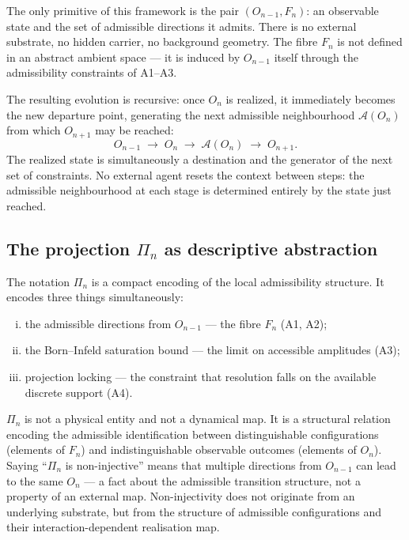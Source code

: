 \documentclass[11pt,a4paper]{article}
\begin{document}
    The only primitive of this framework is the pair $(O_{n-1}, F_n)$: an observable
    state and the set of admissible directions it admits.
    There is no external substrate, no hidden carrier, no background geometry.
    The fibre $F_n$ is not defined in an abstract ambient space — it is induced by
    $O_{n-1}$ itself through the admissibility constraints of A1--A3.

    The resulting evolution is recursive: once $O_n$ is realized, it immediately becomes
    the new departure point, generating the next admissible neighbourhood $\mathcal{A}(O_n)$
    from which $O_{n+1}$ may be reached:
    \begin{equation}
      \label{eq:recursive-chain}
      O_{n-1}
      \;\longrightarrow\; O_n
      \;\longrightarrow\; \mathcal{A}(O_n)
      \;\longrightarrow\; O_{n+1}.
    \end{equation}
    The realized state is simultaneously a destination and the generator of the next set of
    constraints.
    No external agent resets the context between steps: the admissible neighbourhood at
    each stage is determined entirely by the state just reached.

  \subsection{The projection $\Pi_n$ as descriptive abstraction}

    The notation $\Pi_n$ is a compact encoding of the local admissibility structure.
    It encodes three things simultaneously:
    \begin{enumerate}[(i)]
\item the admissible directions from $O_{n-1}$ — the fibre $F_n$ (A1, A2);
\item the Born--Infeld saturation bound — the limit on accessible amplitudes (A3);
\item projection locking — the constraint that resolution falls on the available
discrete support (A4).
    \end{enumerate}

    $\Pi_n$ is not a physical entity and not a dynamical map.
    It is a structural relation encoding the admissible identification between
    distinguishable configurations (elements of $F_n$) and indistinguishable
    observable outcomes (elements of $O_n$).
    Saying ``$\Pi_n$ is non-injective'' means that multiple directions from
    $O_{n-1}$ can lead to the same $O_n$ — a fact about the admissible transition
    structure, not a property of an external map.
    Non-injectivity does not originate from an underlying substrate, but from
    the structure of admissible configurations and their interaction-dependent
    realisation map.
\end{document}
